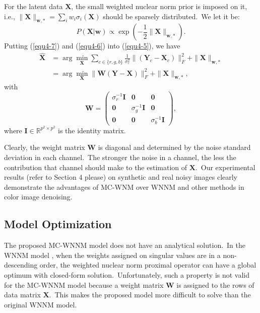 For the latent data $\mathbf{X}$, the small weighted nuclear norm prior is imposed on it, i.e., $\|\mathbf{X}\|_{\bm{w},*}=\sum_{i}w_{i}\sigma_{i}(\mathbf{X})$ should be sparsely distributed.\ We let it be:
\begin{equation}
\label{equ4-7}
P(\mathbf{X}|\bm{w})
\propto
\exp(-\frac{1}{2}\|\mathbf{X}\|_{\bm{w},*}).
\end{equation}
Putting (\ref{equ4-7}) and (\ref{equ4-6}) into (\ref{equ4-5}), we have
\begin{equation}
\label{equ4-8}
\begin{split}
\hat{\mathbf{X}}
&
=
\arg\min_{\mathbf{X}}
\sum_{c\in\{r, g, b\}}
\frac{1}{\sigma_{c}^{2}}\|(\mathbf{Y}_{c}-\mathbf{X}_{c})\|_{F}^{2}+\|\mathbf{X}\|_{\bm{w},*}
\\
&
=
\arg\min_{\mathbf{X}}\|\mathbf{W}(\mathbf{Y}-\mathbf{X})\|_{F}^{2}+\|\mathbf{X}\|_{\bm{w},*},
\end{split}
\end{equation}
with
\begin{equation}
\label{equ4-9}
\mathbf{W}
=
\left( \begin{array}{ccc}
\sigma_{r}^{-1}\mathbf{I} & \mathbf{0} & \mathbf{0}
\\
\mathbf{0} & \sigma_{g}^{-1}\mathbf{I} & \mathbf{0}
\\
\mathbf{0} & \mathbf{0} & \sigma_{b}^{-1}\mathbf{I}
\end{array} \right),
\end{equation}
where $\mathbf{I}
\in\mathbb{R}^{p^{2}\times p^{2}}$ is the identity matrix. 

Clearly, the weight matrix $\mathbf{W}$ is diagonal and determined by the noise standard deviation in each channel.\ The stronger the noise in a channel, the less the contribution that channel should make to the estimation of $\mathbf{X}$.\ Our experimental results (refer to Section 4 please) on synthetic and real noisy images clearly demonstrate the advantages of MC-WNM over WNNM and other methods in color image denoising. 

\subsection{Model Optimization}

The proposed MC-WNNM model does not have an analytical solution.\ In the WNNM model \cite{wnnmijcv}, when the weights assigned on singular values are in a non-descending order, the weighted nuclear norm proximal operator can have a global optimum with closed-form solution.\ Unfortunately, such a property is not valid for the MC-WNNM model because a weight matrix $\mathbf{W}$ is assigned to the rows of data matrix $\mathbf{X}$.\ This makes the proposed model more difficult to solve than the original WNNM model.

